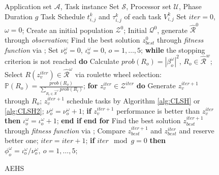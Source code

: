 \documentclass{IEEEtaes}
\makeatletter
\newcommand{\removelatexerror}{\let\@latex@error\@gobble}
\makeatother
\begin{document}
\begin{figure}[!t]
\renewcommand{\algorithmicrequire}{\textbf{Input:}}
\renewcommand{\algorithmicensure}{\textbf{Output:}}
\removelatexerror
\begin{algorithm}[H]
    \caption{AEHS}
    \begin{algorithmic}[1]
        \REQUIRE Application set $\mathcal{A}$, Task instance Set $\mathcal{S}$, Processor set $\mathcal{U}$, Phase Duration $g$         %
        \ENSURE Task Schedule $t_{i,j}^k$ and $\tau_{i,j}^k$ of each task $V_{i,j}^{k}$  %
        \STATE Set $iter=0$, $\omega=0$;
        \STATE Create an initial population $\mathcal{Z}^{0}$;
        \label{alg3:X initial}
        \STATE Initial $\mathcal{Q}^0$, generate $\hat{\mathcal{R}}^0$ through \textit{observation};
        \label{alg3:Q initial}
        \STATE Find the best solution $z_{best}^{0}$ through \textit{fitness function} via ;
        \STATE Set $\nu_o^\omega=0$, $\iota_o^\omega=0$, $o=1,\dots,5$;
        \STATE \textbf{while} the stopping criterion is not reached \textbf{do}
        \STATE \quad Calculate $prob(R_o)=\left|\beta_o^\omega\right|^2$, $R_o\in \hat{\mathcal{R}}^w$;
        \label{alg3:rws1}
        \STATE \quad Select $R(z^{iter}_v) \in \hat{\mathcal{R}}^\omega$ via roulette wheel selection: $\mathbb{P}(R_o) = \frac{prob(R_o)}{\sum_{R_l \in \hat{\mathcal{R}}^\omega} prob(R_l)}$;
        \label{alg3:rws2}
        \STATE \quad \textbf{for} $z^{iter}_v\in \mathcal{Z}^{iter}$ \textbf{do}
        \label{alg3:solution update1}
        \STATE \quad\quad Generate $z^{iter+1}_v$ through $R_o$;
        \STATE \quad\quad $z^{iter+1}_v$ schedule tasks by Algorithm \ref{alg:CLSH} or \ref{alg:CLSH2};
        \STATE \quad\quad $\nu_o^\omega=\nu_o^\omega+1$;
        \STATE \quad\quad \textbf{if} $z^{iter+1}_v$ performance is better than $z^{iter}_v$ \textbf{then}
        \STATE \quad\quad\quad $\iota_o^\omega=\iota_o^\omega+1$;
        \STATE \quad\quad \textbf{end if}
        \STATE \quad \textbf{end for}
        \label{alg3:solution update2}
        \STATE \quad Find the best solution $z_{best}^{iter+1}$ through \textit{fitness function} via ;
        \label{alg3:best update1}
        \STATE \quad Compare $z_{best}^{iter+1}$ and $z_{best}^{iter}$ and reserve better one;
        \label{alg3:best update2}
        \STATE \quad $iter=iter+1$;
        \STATE \quad \textbf{if} $iter\mod g=0$ \textbf{then}
        \label{alg3:quantum update1}
        \STATE \quad\quad $\phi_o^\omega=\iota_o^\omega/\nu_o^\omega,\ o=1,\dots,5$;

\end{algorithmic}
\end{algorithm}
\end{figure}
\end{document}
